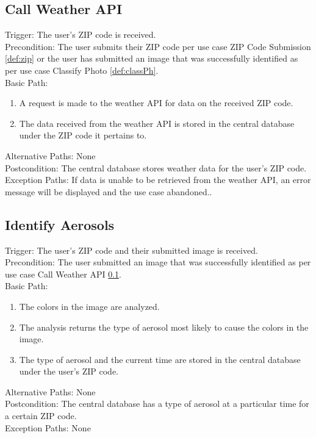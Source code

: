 \documentclass[journal,10pt,draftclsnofoot,onecolumn]{IEEEtran}
\begin{document}
\begin{singlespace}
	\subsection{Call Weather API} \label{def:weathAPI}
		Trigger: The user's ZIP code is received.\\
		Precondition: The user submits their ZIP code per use case ZIP Code Submission \ref{def:zip} or the user has submitted an image that was successfully identified as per use case Classify Photo \ref{def:classPh}.\\
		Basic Path:
		\begin{enumerate}
			\item A request is made to the weather API for data on the received ZIP code.
			\item The data received from the weather API is stored in the central database under the ZIP code it pertains to.
		\end{enumerate}
		Alternative Paths: None\\
		Postcondition: The central database stores weather data for the user's ZIP code.\\
		Exception Paths: If data is unable to be retrieved from the weather API, an error message will be displayed and the use case abandoned..
	
	\subsection{Identify Aerosols} \label{def:idAero}
		Trigger: The user's ZIP code and their submitted image is received.\\
		Precondition: The user submitted an image that was successfully identified as per use case Call Weather API \ref{def:weathAPI}.\\
		Basic Path:
		\begin{enumerate}
			\item The colors in the image are analyzed.
			\item The analysis returns the type of aerosol most likely to cause the colors in the image.
			\item The type of aerosol and the current time are stored in the central database under the user's ZIP code.
		\end{enumerate}
		Alternative Paths: None\\
		Postcondition: The central database has a type of aerosol at a particular time for a certain ZIP code.\\
		Exception Paths: None


\end{singlespace}
\end{document}
